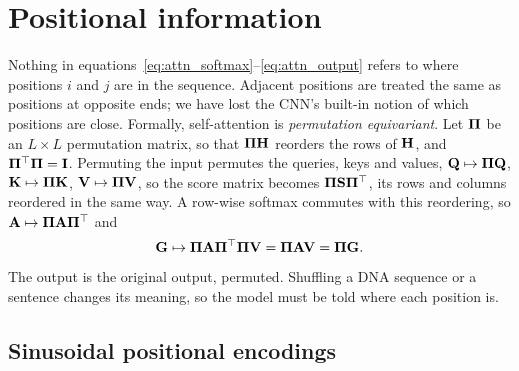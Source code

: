 \section{Positional information}
\label{sec:position}

Nothing in equations~\eqref{eq:attn_softmax}--\eqref{eq:attn_output} refers to where positions $i$ and $j$ are in the sequence. Adjacent positions are treated the same as positions at opposite ends; we have lost the CNN's built-in notion of which positions are close. Formally, self-attention is \emph{permutation equivariant}. Let $\boldsymbol{\Pi}$ be an $L\times L$ permutation matrix, so that $\boldsymbol{\Pi}\mathbf{H}$ reorders the rows of $\mathbf{H}$, and $\boldsymbol{\Pi}^\top\boldsymbol{\Pi}=\mathbf{I}$. Permuting the input permutes the queries, keys and values, $\mathbf{Q}\mapsto\boldsymbol{\Pi}\mathbf{Q}$, $\mathbf{K}\mapsto\boldsymbol{\Pi}\mathbf{K}$, $\mathbf{V}\mapsto\boldsymbol{\Pi}\mathbf{V}$, so the score matrix becomes $\boldsymbol{\Pi}\mathbf{S}\boldsymbol{\Pi}^\top$, its rows and columns reordered in the same way. A row-wise softmax commutes with this reordering, so $\mathbf{A}\mapsto\boldsymbol{\Pi}\mathbf{A}\boldsymbol{\Pi}^\top$ and
\begin{equation}
  \mathbf{G} \mapsto \boldsymbol{\Pi}\mathbf{A}\boldsymbol{\Pi}^\top\boldsymbol{\Pi}\mathbf{V} = \boldsymbol{\Pi}\mathbf{A}\mathbf{V} = \boldsymbol{\Pi}\mathbf{G} .
\end{equation}
The output is the original output, permuted. Shuffling a DNA sequence or a sentence changes its meaning, so the model must be told where each position is.

\subsection{Sinusoidal positional encodings}

